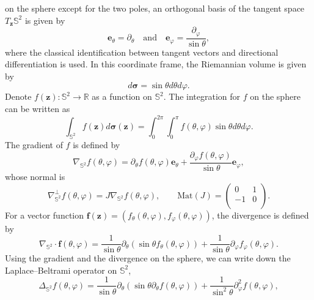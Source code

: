 \documentclass[12pt,reqno]{amsart}
\numberwithin{equation}{section}
\theoremstyle{definition}
\theoremstyle{remark}
\begin{document}
	on the sphere except for the two poles, an orthogonal
	basis of the tangent space $T_{\boldsymbol z}\mathbb S^2$ is given by
	\begin{equation*}
		\boldsymbol e_\theta=\partial_\theta \quad \mathrm{and} \quad \boldsymbol e_\varphi=\frac{\partial_\varphi}{\sin\theta},
	\end{equation*}
	where the classical identification between tangent vectors and directional differentiation is used. In this
	coordinate frame, the Riemannian volume is given by
	\begin{equation*}
		d\boldsymbol\sigma=\sin\theta d\theta d\varphi.
	\end{equation*}
	Denote $f(\boldsymbol z):\mathbb S^2\to \mathbb R$ as a function on $\mathbb S^2$. The integration for $f$ on the sphere can be written as 
	\begin{equation*}
		\int_{\mathbb S^2}f(\boldsymbol z)d\boldsymbol \sigma(\boldsymbol z)=\int_0^{2\pi}\int_0^{\pi}f(\theta,\varphi)\sin\theta d\theta d\varphi.
	\end{equation*}
	The gradient of $f$ is defined by
	\begin{equation*}
		\nabla_{\mathbb S^2} f(\theta,\varphi)=\partial_\theta f(\theta,\varphi)\boldsymbol e_\theta+\frac{\partial_\varphi f(\theta,\varphi)}{\sin\theta}\boldsymbol e_\varphi,
	\end{equation*}
	whose normal is 
	\begin{equation*}
		\nabla^{\perp}_{\mathbb{S}^2} f(\theta,\varphi)=J\nabla_{\mathbb{S}^2} f(\theta,\varphi),\quad\quad \mathrm{Mat}(J)=\left(
		\begin{array}{ccc}
			0 & 1 \\
			-1 & 0 \\
		\end{array}
		\right).
	\end{equation*}
	For a vector function $\boldsymbol f(\boldsymbol z) = (f_\theta(\theta, \varphi), f_\varphi(\theta, \varphi))$, the divergence is defined by
	\begin{equation*}
		\nabla_{\mathbb S^2} \cdot\boldsymbol f(\theta,\varphi)=\frac{1}{\sin\theta}\partial_\theta (\sin\theta f_\theta(\theta,\varphi)) +\frac{1}{\sin\theta}\partial_\varphi f_\varphi(\theta,\varphi).
	\end{equation*}
	Using the gradient and the divergence on the sphere, we can write down the Laplace--Beltrami operator on  $\mathbb S^2$, 
	\begin{equation*}
		\Delta_{\mathbb S^2} f(\theta,\varphi)=\frac{1}{\sin\theta}\partial_\theta (\sin\theta\partial_\theta f(\theta,\varphi)) +\frac{1}{\sin^2\theta}\partial^2_\varphi f(\theta,\varphi),
	\end{equation*}
\end{document}
